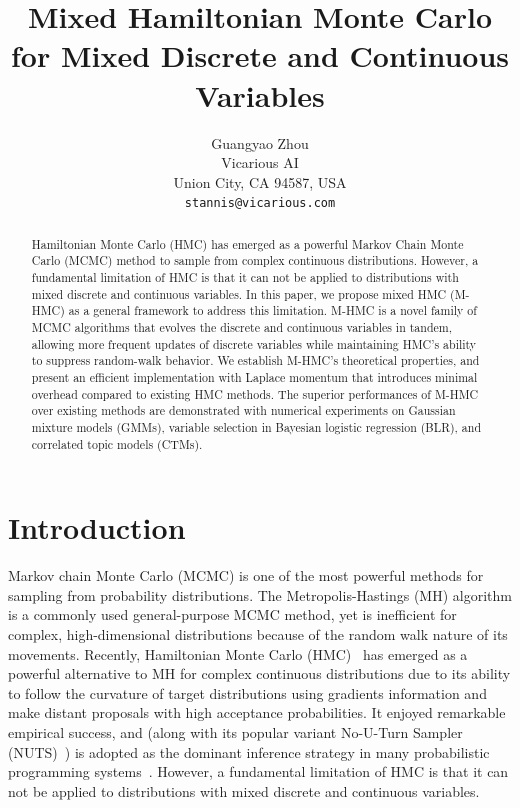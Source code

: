 \documentclass{article}
\title{Mixed Hamiltonian Monte Carlo for Mixed Discrete and Continuous Variables}
\author{%
    Guangyao Zhou\\
  Vicarious AI\\
  Union City, CA 94587, USA \\
  \texttt{stannis@vicarious.com} \\
}
\begin{document}
\maketitle

\begin{abstract}
	Hamiltonian Monte Carlo (HMC) has emerged as a powerful Markov Chain Monte Carlo (MCMC) method to sample from complex continuous distributions. However, a fundamental limitation of HMC is that it can not be applied to distributions with mixed discrete and continuous variables. In this paper, we propose mixed HMC (M-HMC) as a general framework to address this limitation. M-HMC is a novel family of MCMC algorithms that evolves the discrete and continuous variables in tandem, allowing more frequent updates of discrete variables while maintaining HMC's ability to suppress random-walk behavior. We establish M-HMC's theoretical properties, and present an efficient implementation with Laplace momentum that introduces minimal overhead compared to existing HMC methods. The superior performances of M-HMC over existing methods are demonstrated with numerical experiments on Gaussian mixture models (GMMs), variable selection in Bayesian logistic regression (BLR), and correlated topic models (CTMs).
\end{abstract}

\section{Introduction}

Markov chain Monte Carlo (MCMC) is one of the most powerful methods for sampling from probability distributions. The Metropolis-Hastings (MH) algorithm is a commonly used general-purpose MCMC method, yet is inefficient for complex, high-dimensional distributions because of the random walk nature of its movements. Recently, Hamiltonian Monte Carlo (HMC)~\cite{Duane1987-ta, Neal2012-cp, Betancourt2017-vx} has emerged as a powerful alternative to MH for complex continuous distributions due to its ability to follow the curvature of target distributions using gradients information and make distant proposals with high acceptance probabilities. It enjoyed remarkable empirical success, and (along with its popular variant No-U-Turn Sampler (NUTS)~\cite{Hoffman2014-so}) is adopted as the dominant inference strategy in many probabilistic programming systems~\cite{Carpenter2017-zi, Salvatier2016, bingham2018pyro, Phan2019-vh, ge2018t, Cusumano-Towner:2019:GGP:3314221.3314642}. However, a fundamental limitation of HMC is that it can not be applied to distributions with mixed discrete and continuous variables. 
\end{document}
